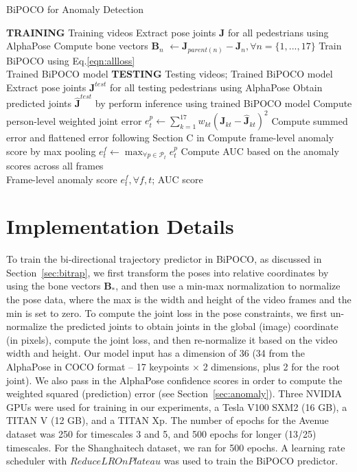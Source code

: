\documentclass[nohyperref]{article}
\theoremstyle{plain}
\theoremstyle{definition}
\theoremstyle{remark}
\begin{document}
\begin{algorithm}[t]
\caption{BiPOCO for Anomaly Detection} 
\label{alg:1}
\begin{algorithmic} 
\State  \textbf{TRAINING} 
\Require Training videos 
\State Extract pose joints $\mathbf{J}$ for all pedestrians using AlphaPose
\State Compute bone vectors $\mathbf{B}_n$ $\gets {\mathbf{J}}_{parent(n)} -{\mathbf{J}}_{n}, \forall n=\{1,...,17\}$ 
\State Train BiPOCO using  Eq.\eqref{eqn:allloss}\\
\Return Trained BiPOCO model
\Statex 
\Statex  \textbf{TESTING}
\Require Testing videos; Trained BiPOCO model
\State Extract pose joints $\mathbf{J}^{test}$ for all testing pedestrians using AlphaPose
\State Obtain predicted joints $\hat{\mathbf{J}}^{test}$ by perform inference using trained BiPOCO model
\State Compute person-level weighted joint error $e^p_{t} \gets \sum_{k=1}^{17} w_{kt} (\mathbf{J}_{kt} - \hat{\mathbf{J}}_{kt})^2$ 
\State Compute summed error and flattened error following Section C in \cite{kanu2021leveraging}
\State Compute frame-level anomaly score by max pooling
$ e^f_t \gets \max_{\forall p\in \mathcal{P}_t} e^p_{t}$
\State Compute AUC based on the anomaly scores across all frames\\
\Return Frame-level anomaly score $ e^f_t, \forall f,t$; AUC score
\end{algorithmic}
\end{algorithm}



\section{Implementation Details}
\label{appendix:implementation}



To train the bi-directional trajectory predictor in BiPOCO,  as discussed in Section~\ref{sec:bitrap}, we first transform the poses into relative coordinates by using the bone vectors $\mathbf{B}_*$, and then use a min-max normalization to normalize the pose data, where the max is the width and height of the video frames and the min is set to zero. To compute the joint loss in the pose constraints, we first un-normalize the predicted joints to obtain joints in the global (image) coordinate (in pixels), compute the joint loss, and then re-normalize it based on the video width and height. Our model input has a dimension of 36 (34 from the AlphaPose in COCO format -- 17 keypoints $\times$ 2 dimensions, plus 2 for the root joint). We also pass in the AlphaPose confidence scores in order to compute the weighted squared (prediction) error (see Section~\ref{sec:anomaly}). Three NVIDIA GPUs were used for training in our experiments, a Tesla V100 SXM2 (16 GB), a TITAN V (12 GB), and a TITAN Xp. The  number of epochs for the Avenue dataset was 250 for timescales 3 and 5, and 500 epochs for longer (13/25) timescales. For the Shanghaitech dataset, we ran for 500 epochs. A learning rate scheduler with 
$ReduceLROnPlateau$ was used to train the BiPOCO predictor.
\end{document}
